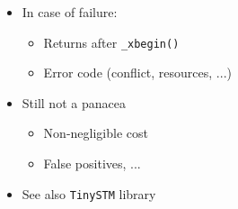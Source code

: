 \documentclass[xcolor={x11names,svgnames},x11names,svgnames]{beamer}
\begin{document}
\begin{frame}[fragile=singleslide, label=rtm]
\begin{columns}
\begin{column}{0.6\textwidth}
\begin{itemize}
  \item \alert{In case of failure}:
    \begin{itemize}
    \item Returns after \texttt{_xbegin()}
    \item Error code (conflict, resources, ...)
    \end{itemize}

  \item Still not a panacea
    \begin{itemize}
    \item Non-negligible cost
    \item False positives, ...
    \end{itemize}

  \item See also \texttt{TinySTM} library
  \end{itemize}
\end{column}
\end{columns}
\end{frame}

\end{document}
